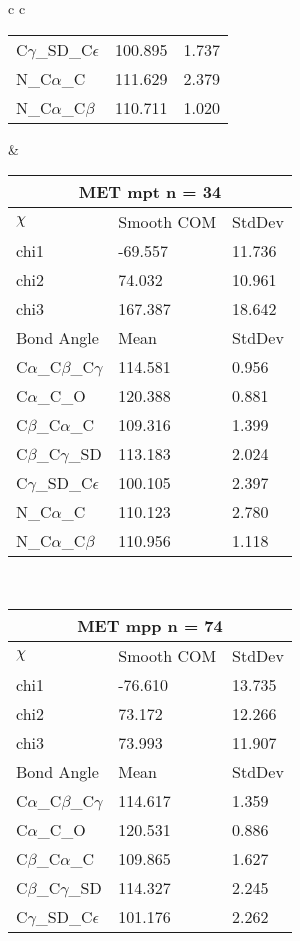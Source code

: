 \begin{longtable}{ c c }
\begin{tabular}{ l l l }
  C$\gamma$\_SD\_C$\epsilon$ & 100.895 & 1.737\\
  N\_C$\alpha$\_C & 111.629 & 2.379\\
  N\_C$\alpha$\_C$\beta$ & 110.711 & 1.020\\
  \bottomrule
  \end{tabular}
  &
  \begin{tabular}{ l l l }
  \toprule
  \multicolumn{3}{c}{MET \textbf{mpt} n = 34} \\ \toprule
  $\chi$       & Smooth COM & StdDev \\ \midrule
  chi1 & -69.557 & 11.736 \\ 
  chi2 & 74.032 & 10.961 \\ 
  chi3 & 167.387 & 18.642 \\ \midrule
  Bond Angle   & Mean     & StdDev \\ \midrule
  C$\alpha$\_C$\beta$\_C$\gamma$ & 114.581 & 0.956\\
  C$\alpha$\_C\_O & 120.388 & 0.881\\
  C$\beta$\_C$\alpha$\_C & 109.316 & 1.399\\
  C$\beta$\_C$\gamma$\_SD & 113.183 & 2.024\\
  C$\gamma$\_SD\_C$\epsilon$ & 100.105 & 2.397\\
  N\_C$\alpha$\_C & 110.123 & 2.780\\
  N\_C$\alpha$\_C$\beta$ & 110.956 & 1.118\\
  \bottomrule
  \end{tabular}
  \\
  \begin{tabular}{ l l l }
  \toprule
  \multicolumn{3}{c}{MET \textbf{mpp} n = 74} \\ \toprule
  $\chi$       & Smooth COM & StdDev \\ \midrule
  chi1 & -76.610 & 13.735 \\ 
  chi2 & 73.172 & 12.266 \\ 
  chi3 & 73.993 & 11.907 \\ \midrule
  Bond Angle   & Mean     & StdDev \\ \midrule
  C$\alpha$\_C$\beta$\_C$\gamma$ & 114.617 & 1.359\\
  C$\alpha$\_C\_O & 120.531 & 0.886\\
  C$\beta$\_C$\alpha$\_C & 109.865 & 1.627\\
  C$\beta$\_C$\gamma$\_SD & 114.327 & 2.245\\
  C$\gamma$\_SD\_C$\epsilon$ & 101.176 & 2.262\\

\end{tabular}
\end{longtable}
